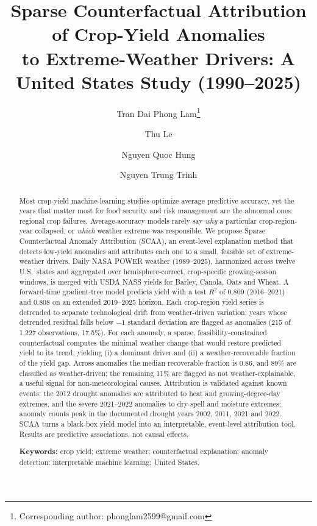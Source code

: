 \documentclass[11pt]{article}
\title{\textbf{Sparse Counterfactual Attribution of Crop-Yield Anomalies\\
to Extreme-Weather Drivers: A United States Study (1990--2025)}}
\author[1]{Tran Dai Phong Lam\thanks{Corresponding author: phonglam2599@gmail.com}}
\author[1]{Thu Le}
\author[1]{Nguyen Quoc Hung}
\author[1]{Nguyen Trung Trinh}
\affil[1]{FPT University, Ho Chi Minh City, Vietnam}
\date{}
\begin{document}
\maketitle

\begin{abstract}
Most crop-yield machine-learning studies optimize average predictive accuracy, yet
the years that matter most for food security and risk management are the abnormal
ones: regional crop failures. Average-accuracy models rarely say \emph{why} a
particular crop-region-year collapsed, or \emph{which} weather extreme was
responsible. We propose Sparse Counterfactual Anomaly Attribution (SCAA), an
event-level explanation method that detects low-yield anomalies and attributes each
one to a small, feasible set of extreme-weather drivers. Daily NASA POWER weather
(1989--2025), harmonized across twelve U.S.\ states and aggregated over
hemisphere-correct, crop-specific growing-season windows, is merged with USDA NASS
yields for Barley, Canola, Oats and Wheat. A forward-time gradient-tree model
predicts yield with a test $R^2$ of 0.809 (2016--2021) and 0.808 on an extended
2019--2025 horizon. Each crop-region yield series is detrended to separate
technological drift from weather-driven variation; years whose detrended residual
falls below $-1$ standard deviation are flagged as anomalies (215 of 1{,}227
observations, 17.5\%). For each anomaly, a sparse, feasibility-constrained
counterfactual computes the minimal weather change that would restore predicted
yield to its trend, yielding (i) a dominant driver and (ii) a weather-recoverable
fraction of the yield gap. Across anomalies the median recoverable fraction is 0.86,
and 89\% are classified as weather-driven; the remaining 11\% are flagged as
not weather-explainable, a useful signal for non-meteorological causes. Attribution
is validated against known events: the 2012 drought anomalies are attributed to heat
and growing-degree-day extremes, and the severe 2021--2022 anomalies to dry-spell and
moisture extremes; anomaly counts peak in the documented drought years 2002, 2011,
2021 and 2022. SCAA turns a black-box yield model into an interpretable,
event-level attribution tool. Results are predictive associations, not causal effects.

\smallskip
\noindent\textbf{Keywords:} crop yield; extreme weather; counterfactual explanation;
anomaly detection; interpretable machine learning; United States.
\end{abstract}
\end{document}
